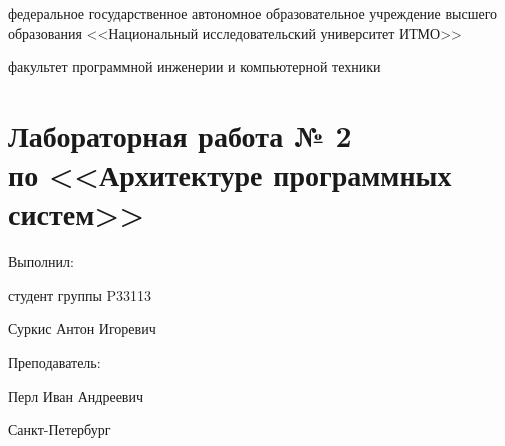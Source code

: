 \begin{titlepage}
    \begin{center}
        федеральное государственное автономное образовательное учреждение высшего образования
        <<Национальный исследовательский университет ИТМО>>

        \bigskip

        факультет программной инженерии и компьютерной техники

        \vfill

        \section*{Лабораторная работа № 2\\
        по <<Архитектуре программных систем>>}

        \bigskip

        \begin{flushright}
            Выполнил:

            студент группы P33113

            Суркис Антон Игоревич

            Преподаватель:

            Перл Иван Андреевич
        \end{flushright}

        \vfill

        Санкт-Петербург

        \the\year
    \end{center}
\end{titlepage}
